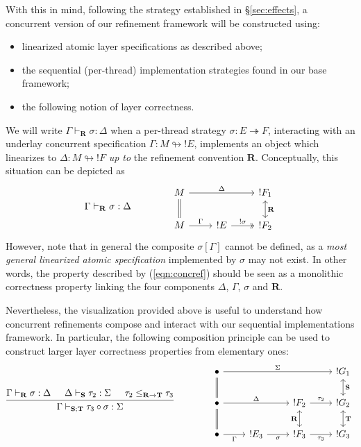 With this in mind,
following the strategy established in \S\ref{sec:effects},
a concurrent version of our refinement framework
will be constructed using:
\begin{itemize}
  \item linearized atomic layer specifications as described above;
  \item the sequential (per-thread) implementation strategies
    found in our base framework;
  \item the following notion of layer correctness.
\end{itemize}
We will write
$\Gamma \vdash_\mathbf{R} \sigma : \Delta$
when a per-thread strategy
$\sigma : E \twoheadrightarrow F$,
interacting with an underlay concurrent specification
$\Gamma : M \looparrowright {!E}$,
implements an object which linearizes to
$\Delta : M \looparrowright {!F}$
\emph{up to} the refinement convention $\mathbf{R}$.
Conceptually,
this situation can be depicted as
\begin{equation}
  \Gamma \vdash_\mathbf{R} \sigma : \Delta
  \qquad \qquad
  \begin{tikzcd}
    M \ar[d, equal] \ar[rr, "\Delta"] & &
    !F_1 \ar[d, "\mathbf{R}", leftrightarrow] \\
    M \ar[r, "\Gamma"] &
    !E \ar[r, "!\sigma", twoheadrightarrow] & !F_2
  \end{tikzcd}
  \label{eqn:concref}
\end{equation}
However,
note that in general
the composite $\sigma[\Gamma]$
cannot be defined,
as a \emph{most general linearized atomic specification}
implemented by $\sigma$ may not exist.
In other words,
the property described by (\ref{eqn:concref})
should be seen as a monolithic correctness property
linking the four components $\Delta$, $\Gamma$, $\sigma$ and $\mathbf{R}$.

Nevertheless,
the visualization provided above
is useful to understand how
concurrent refinements compose and
interact with our sequential implementations framework.
In particular,
the following composition principle
can be used to construct
larger layer correctness properties
from elementary ones:
\[
  \begin{prooftree}
    \hypo{\Gamma \vdash_\mathbf{R} \sigma : \Delta}
    \hypo{\Delta \vdash_\mathbf{S} \tau_2 : \Sigma}
    \hypo{\tau_2 \le_{\mathbf{R} \rightarrow \mathbf{T}} \tau_3}
    \infer3{\Gamma \vdash_{\mathbf{S} \mathbin; \mathbf{T}} \tau_3 \circ \sigma : \Sigma}
  \end{prooftree}
  \qquad \qquad
  \begin{tikzcd}
    \bullet \ar[rrr, "\Sigma"] \ar[d, equal] & & &
    !G_1 \ar[d, "\mathbf{S}", leftrightarrow] \\
    \bullet \ar[rr, "\Delta"] \ar[d, equal] & &
    !F_2 \ar[r, "\tau_2"] \ar[d, "\mathbf{R}"', leftrightarrow] &
    !G_2 \ar[d, "\mathbf{T}", leftrightarrow] \\
    \bullet \ar[r, "\Gamma"'] &
    !E_3 \ar[r, "\sigma"'] &
    !F_3 \ar[r, "\tau_3"'] &
    !G_3
  \end{tikzcd}
\]

